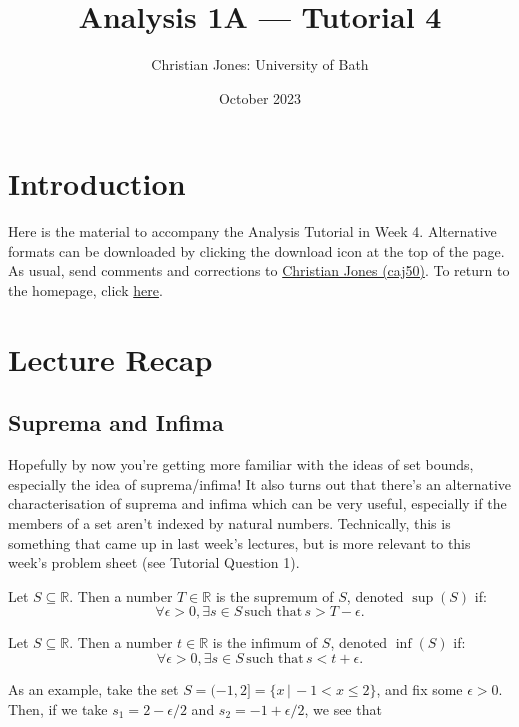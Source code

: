 \documentclass[
  17pt,
  a4paper]{extarticle}
\title{Analysis 1A --- Tutorial 4}
\author{Christian Jones: University of Bath}
\date{October 2023}
\theoremstyle{plain}
\theoremstyle{definition}
\theoremstyle{plain}
\theoremstyle{plain}
\theoremstyle{plain}
\theoremstyle{plain}
\theoremstyle{definition}
\theoremstyle{definition}
\theoremstyle{remark}
\theoremstyle{remark}
\let\BeginKnitrBlock\begin \let\EndKnitrBlock\end
\renewcommand{\;}{\,}
\begin{document}
\maketitle

{
\setcounter{tocdepth}{2}
\tableofcontents
}
\newpage
{}

\hypertarget{introduction}{%
\section*{Introduction}\label{introduction}}

Here is the material to accompany the Analysis Tutorial in Week 4. Alternative formats can be downloaded by clicking the download icon at the top of the page. As usual, send comments and corrections to \href{mailto:caj50@bath.ac.uk}{Christian Jones (caj50)}. To return to the homepage, click \href{http://caj50.github.io/tutoring.html}{here}.

\hypertarget{lecture-recap}{%
\section{Lecture Recap}\label{lecture-recap}}

\hypertarget{suprema-and-infima}{%
\subsection{Suprema and Infima}\label{suprema-and-infima}}

Hopefully by now you're getting more familiar with the ideas of set bounds, especially the idea of suprema/infima! It also turns out that there's an alternative characterisation of suprema and infima which can be very useful, especially if the members of a set aren't indexed by natural numbers. Technically, this is something that came up in last week's lectures, but is more relevant to this week's problem sheet (see Tutorial Question 1).

\BeginKnitrBlock{proposition}
{\label{prp:prop1} }Let \(S\subseteq\mathbb{R}\). Then a number \(T\in\mathbb{R}\) is the supremum of \(S\), denoted \(\sup(S)\) if: \[\forall \epsilon > 0, \exists s \in S\; \text{such that} \; s > T - \epsilon.\]
\EndKnitrBlock{proposition}

\BeginKnitrBlock{proposition}
{\label{prp:prop2} }Let \(S\subseteq\mathbb{R}\). Then a number \(t\in\mathbb{R}\) is the infimum of \(S\), denoted \(\inf(S)\) if: \[\forall \epsilon > 0, \exists s \in S\; \text{such that} \; s < t + \epsilon.\]
\EndKnitrBlock{proposition}
As an example, take the set \(S = (-1,2] = \lbrace x \, \lvert\, -1 < x \leq 2\rbrace\), and fix some \(\epsilon > 0\). Then, if we take \(s_1 = 2 - \epsilon/2\) and \(s_2 = -1 + \epsilon/2\), we see that
\end{document}
